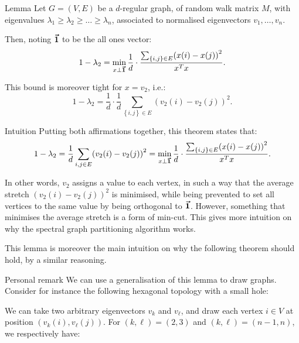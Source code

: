 \documentclass[a4paper]{article}
\begin{document}
\begin{parag}{Lemma}
    Let $G = \left(V, E\right)$ be a $d$-regular graph, of random walk matrix $M$, with eigenvalues $\lambda_1 \geq \lambda_2 \geq \ldots \geq \lambda_n$, associated to normalised eigenvectors $v_1, \ldots, v_n$.

    Then, noting $\bm{\protect\vec{1}}$ to be the all ones vector: 
    \[1 - \lambda_2 = \min_{x \perp \bvec{1}} \dfrac{1}{d}\cdot \dfrac{\sum_{\left\{i, j\right\} \in E} \left(x\left(i\right) - x\left(j\right)\right)^2}{x^T x}.\]

    This bound is moreover tight for $x = v_2$, i.e.:
    \[1 - \lambda_2 = \frac{1}{d}\cdot \frac{1}{d} \sum_{\left\{i, j\right\} \in E} \left(v_2\left(i\right) - v_2\left(j\right)\right)^2.\]

    \begin{subparag}{Intuition}
        Putting both affirmations together, this theorem states that:
        \[1 - \lambda_2 = \frac{1}{d} \sum_{i, j \in E} \left(v_2\left(i\right) - v_2\left(j\right)\right)^2 = \min_{x \perp \bvec{1}} \dfrac{1}{d}\cdot \dfrac{\sum_{\left\{i, j\right\} \in E} \left(x\left(i\right) - x\left(j\right)\right)^2}{x^T x}.\]

        In other words, $v_2$ assigns a value to each vertex, in such a way that the average stretch $\left(v_2\left(i\right) - v_2\left(j\right)\right)^2$ is minimised, while being prevented to set all vertices to the same value by being orthogonal to $\bm{\protect\vec{1}}$. However, something that minimises the average stretch is a form of min-cut.  This gives more intuition on why the spectral graph partitioning algorithm works.

        This lemma is moreover the main intuition on why the following theorem should hold, by a similar reasoning.
    \end{subparag}

    \begin{subparag}{Personal remark}
        We can use a generalisation of this lemma to draw graphs. Consider for instance the following hexagonal topology with a small hole:

        We can take two arbitrary eigenvectors $v_k$ and $v_{\ell}$, and draw each vertex $i \in V$ at position $\left(v_k\left(i\right), v_{\ell}\left(j\right)\right)$. For $\left(k, \ell\right) = \left(2, 3\right)$ and $\left(k, \ell\right) = \left(n-1, n\right)$, we respectively have:
        \begin{center}
        \begin{minipage}{0.45\textwidth}
        \end{minipage}
        \hfill
        \begin{minipage}{0.45\textwidth}
        \end{minipage}
        \end{center}
        

\end{subparag}
\end{parag}
\end{document}
